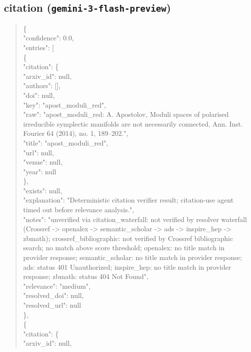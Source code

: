 \documentclass[11pt]{article}
\begin{document}
\subsection*{citation (\texttt{gemini-3-flash-preview})}
\begin{quote}\small\ttfamily\raggedright
\{\\
  "confidence": 0.0,\\
  "entries": [\\
    \{\\
      "citation": \{\\
        "arxiv\_id": null,\\
        "authors": [],\\
        "doi": null,\\
        "key": "apost\_moduli\_red",\\
        "raw": "apost\_moduli\_red: A. Apostolov, Moduli spaces of polarised irreducible symplectic manifolds are not necessarily connected, Ann. Inst. Fourier 64 (2014), no. 1, 189--202.",\\
        "title": "apost\_moduli\_red",\\
        "url": null,\\
        "venue": null,\\
        "year": null\\
      \},\\
      "exists": null,\\
      "explanation": "Deterministic citation verifier result; citation-use agent timed out before relevance analysis.",\\
      "notes": "unverified via citation\_waterfall: not verified by resolver waterfall (Crossref -> openalex -> semantic\_scholar -> ads -> inspire\_hep -> zbmath); crossref\_bibliographic: not verified by Crossref bibliographic search; no match above score threshold; openalex: no title match in provider response; semantic\_scholar: no title match in provider response; ads: status 401 Unauthorized; inspire\_hep: no title match in provider response; zbmath: status 404 Not Found",\\
      "relevance": "medium",\\
      "resolved\_doi": null,\\
      "resolved\_url": null\\
    \},\\
    \{\\
      "citation": \{\\
        "arxiv\_id": null,\\

\end{quote}
\end{document}
